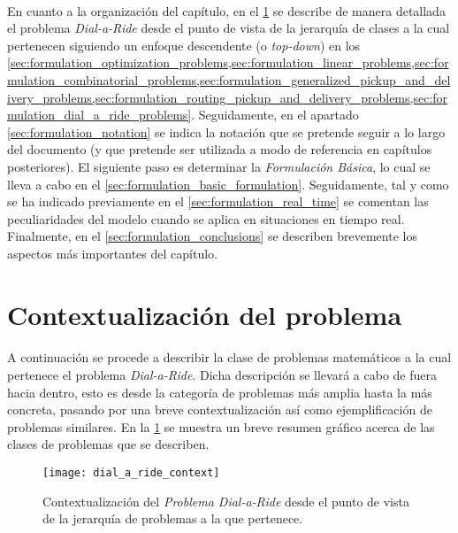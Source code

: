 \documentclass{subfiles}
\begin{document}
      \paragraph{}
      En cuanto a la organización del capítulo, en el \cref{sec:formulation_contextualization} se describe de manera detallada el problema \emph{Dial-a-Ride} desde el punto de vista de la jerarquía de clases a la cual pertenecen siguiendo un enfoque descendente (o \emph{top-down}) en los \cref{sec:formulation_optimization_problems,sec:formulation_linear_problems,sec:formulation_combinatorial_problems,sec:formulation_generalized_pickup_and_delivery_problems,sec:formulation_routing_pickup_and_delivery_problems,sec:formulation_dial_a_ride_problems}. Seguidamente, en el apartado \cref{sec:formulation_notation} se indica la notación que se pretende seguir a lo largo del documento (y que pretende ser utilizada a modo de referencia en capítulos posteriores). El siguiente paso es determinar la \emph{Formulación Básica}, lo cual se lleva a cabo en el \cref{sec:formulation_basic_formulation}. Seguidamente, tal y como se ha indicado previamente en el \cref{sec:formulation_real_time} se comentan las peculiaridades del modelo cuando se aplica en situaciones en tiempo real. Finalmente, en el \cref{sec:formulation_conclusions} se describen brevemente los aspectos más importantes del capítulo.

    \section{Contextualización del problema}
    \label{sec:formulation_contextualization}

      \paragraph{}
      A continuación se procede a describir la clase de problemas matemáticos a la cual pertenece el problema \emph{Dial-a-Ride}. Dicha descripción se llevará a cabo de fuera hacia dentro, esto es desde la categoría de problemas más amplia hasta la más concreta, pasando por una breve contextualización así como ejemplificación de problemas similares. En la \cref{img:formulation_dial_a_ride_contextualization} se muestra un breve resumen gráfico acerca de las clases de problemas que se describen.

      \begin{figure}[ht]
        \centering
        \texttt{[image: dial\_a\_ride\_context]}
        \caption{Contextualización del \emph{Problema Dial-a-Ride} desde el punto de vista de la jerarquía de problemas a la que pertenece.}
        \label{img:formulation_dial_a_ride_contextualization}
      \end{figure}
\end{document}
